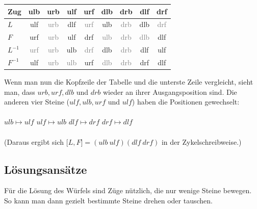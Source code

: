 \documentclass[12pt,a4paper, usenames, dvipsnames]{article}
\begin{document}
\begin{center}
\begin{tabular}{lcccccccc}
\toprule
\textbf{Zug} & \textbf{ulb} & \textbf{urb} & \textbf{ulf} & \textbf{urf} & \textbf{dlb} & \textbf{drb} & \textbf{dlf} & \textbf{drf} \\

\midrule
$L$ & ulf & \textcolor{gray}{urb} & dlf & \textcolor{gray}{urf} & ulb & \textcolor{gray}{drb} & dlb & \textcolor{gray}{drf} \\

$F$ & urf & \textcolor{gray}{urb} & ulf &  drf & \textcolor{gray}{ulb} & \textcolor{gray}{drb} & \textcolor{gray}{dlb} & dlf \\

$L^{-1}$ & \textcolor{gray}{urf} & \textcolor{gray}{urb} & ulb & \textcolor{gray}{drf} & dlb & \textcolor{gray}{drb} & dlf & ulf \\

$F^{-1}$ \: & ulf & \textcolor{gray}{urb} & \textcolor{gray}{ulb} & urf & \textcolor{gray}{dlb} & \textcolor{gray}{drb} & drf & dlf\\
\bottomrule
\end{tabular}
\end{center}

Wenn man nun die Kopfzeile der Tabelle und die unterste Zeile vergleicht, sieht man, dass $urb, urf, dlb$ und $drb$ wieder an ihrer Ausgangsposition sind. Die anderen vier Steine ($ulf, ulb, urf$ und $ulf$) haben die Positionen gewechselt: \\
\\
$ulb \mapsto ulf$ \hspace*{2.5cm }$ulf  \mapsto ulb$ \hspace*{2.5cm } $dlf \mapsto drf$ \hspace*{2.5cm } $drf \mapsto dlf$
\\
\\
(Daraus ergibt sich $\lbrack L, F \rbrack  = (ulb \ ulf)(dlf \ drf)$ in der Zykelschreibweise.)

%
%
%
%
%
%
%
%
%
%
%
%
%
%
%
%
%
%
%
%
\subsection*{Lösungsansätze}
Für die Lösung des Würfels sind Züge nützlich, die nur wenige Steine bewegen. So kann man dann gezielt bestimmte Steine drehen oder tauschen. 
\end{document}
